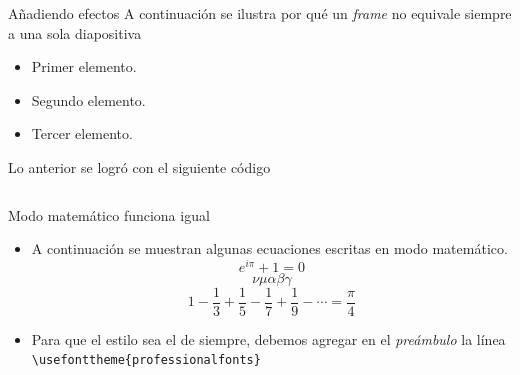 \documentclass{beamer}
\begin{document}
    \begin{frame}{Añadiendo efectos}
        A continuación se ilustra por qué un \textsl{frame} no equivale siempre a una sola diapositiva \pause \\ [3ex]
        \begin{minipage}{0.45\linewidth}
            \begin{itemize}
                \item Primer elemento.\pause
                \item Segundo elemento.\pause
                \item Tercer elemento.\pause
            \end{itemize}
        \end{minipage}
        \begin{minipage}{0.45\linewidth}
            Lo anterior se logró con el siguiente código \pause
            \inputminted[fontsize=\scriptsize, frame=single]{latex}{pause_ex.tex}
        \end{minipage}
    \end{frame}

    \begin{frame}[fragile]{Modo matemático funciona igual}
        \begin{itemize}
            \justifying
            \item A continuación se muestran algunas ecuaciones escritas en modo matemático.
            \vspace{9pt}
            \begin{equation}
                e^{i\pi} + 1 = 0
            \end{equation}
            \begin{equation}
                \nu\mu\alpha\beta\gamma
            \end{equation}
            \begin{equation}
                1 - \frac{1}{3} + \frac{1}{5} - \frac{1}{7} + \frac{1}{9} - \cdots = \frac{\pi}{4}
            \end{equation}
            \vspace{3pt}
            \item Para que el estilo sea el de siempre, debemos agregar en el
             \textsl{preámbulo} la línea {\color{mygreen} \verb|\usefonttheme{|}\verb|professionalfonts|{\color{mygreen}\verb|}|}
        \end{itemize}
    \end{frame}
\end{document}
